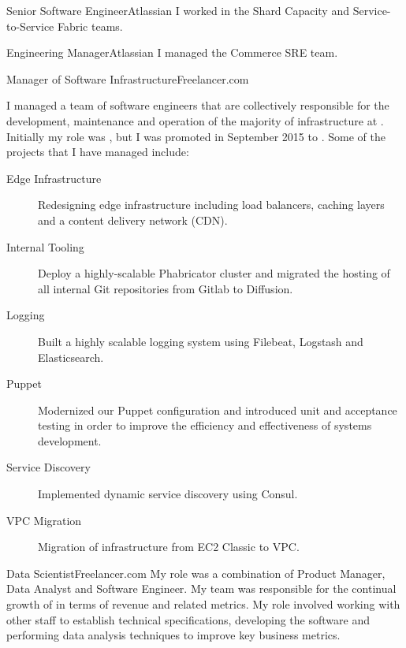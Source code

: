 \begin{professionalExperience}

{Senior Software Engineer}{Atlassian}
{I worked in the Shard Capacity and Service-to-Service Fabric teams.}

{Engineering Manager}{Atlassian}
{I managed the Commerce SRE team.}

{Manager of Software Infrastructure}{Freelancer.com}
{
  I managed a team of software engineers that are collectively
  responsible for the development, maintenance and operation of the majority of
  infrastructure at . Initially my role was
  , but I was promoted in September
  2015 to . Some of the projects
  that I have managed include:

  \begin{description}
    \item[Edge Infrastructure] Redesigning edge infrastructure including load
      balancers, caching layers and a content delivery network (CDN).
    \item[Internal Tooling] Deploy a highly-scalable Phabricator cluster and
      migrated the hosting of all internal Git repositories from Gitlab to
      Diffusion.
    \item[Logging] Built a highly scalable logging system using Filebeat,
      Logstash and Elasticsearch.
    \item[Puppet] Modernized our Puppet configuration and introduced unit and
      acceptance testing in order to improve the efficiency and effectiveness of
      systems development.
    \item[Service Discovery] Implemented dynamic service discovery using Consul.
    \item[VPC Migration] Migration of infrastructure from EC2 Classic to VPC\@.
  \end{description}
}

{Data Scientist}{Freelancer.com}
{
  My role was a combination of Product Manager, Data Analyst and Software
  Engineer. My team was responsible for the continual growth of
   in terms of revenue and related metrics. My role
  involved working with other staff to establish technical specifications,
  developing the software and performing data analysis techniques to improve key
  business metrics.
}

\end{professionalExperience}

